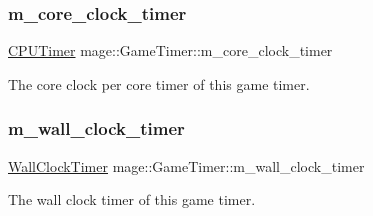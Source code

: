\subsubsection{\texorpdfstring{m\+\_\+core\+\_\+clock\+\_\+timer}{m\_core\_clock\_timer}}
{\footnotesize\ttfamily \mbox{\hyperlink{namespacemage_a1032d81f22079b7190cac3bf14136068}{C\+P\+U\+Timer}} mage\+::\+Game\+Timer\+::m\+\_\+core\+\_\+clock\+\_\+timer\hspace{0.3cm}{\ttfamily [private]}}

The core clock per core timer of this game timer. \mbox{\label{classmage_1_1_game_timer_ae3746f7a55d6b150f2d1fead4a1f227c}} 
\subsubsection{\texorpdfstring{m\+\_\+wall\+\_\+clock\+\_\+timer}{m\_wall\_clock\_timer}}
{\footnotesize\ttfamily \mbox{\hyperlink{namespacemage_a06f4035ef59f07892e594bf1178a108a}{Wall\+Clock\+Timer}} mage\+::\+Game\+Timer\+::m\+\_\+wall\+\_\+clock\+\_\+timer\hspace{0.3cm}{\ttfamily [private]}}

The wall clock timer of this game timer. 